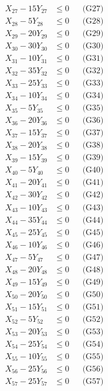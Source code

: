 \documentclass[a4paper,10pt]{article}
\begin{document}
{\begin{align}
X_{27} - 15Y_{27} &\leq 0 && \text{(G27)} \\
X_{28} - 5Y_{28} &\leq 0 && \text{(G28)} \\
X_{29} - 20Y_{29} &\leq 0 && \text{(G29)} \\
X_{30} - 30Y_{30} &\leq 0 && \text{(G30)} \\
X_{31} - 10Y_{31} &\leq 0 && \text{(G31)} \\
X_{32} - 35Y_{32} &\leq 0 && \text{(G32)} \\
\allowbreak
X_{33} - 25Y_{33} &\leq 0 && \text{(G33)} \\
X_{34} - 10Y_{34} &\leq 0 && \text{(G34)} \\
X_{35} - 5Y_{35} &\leq 0 && \text{(G35)} \\
X_{36} - 20Y_{36} &\leq 0 && \text{(G36)} \\
X_{37} - 15Y_{37} &\leq 0 && \text{(G37)} \\
X_{38} - 20Y_{38} &\leq 0 && \text{(G38)} \\
X_{39} - 15Y_{39} &\leq 0 && \text{(G39)} \\
X_{40} - 5Y_{40} &\leq 0 && \text{(G40)} \\
X_{41} - 20Y_{41} &\leq 0 && \text{(G41)} \\
X_{42} - 30Y_{42} &\leq 0 && \text{(G42)} \\
\allowbreak
X_{43} - 10Y_{43} &\leq 0 && \text{(G43)} \\
X_{44} - 35Y_{44} &\leq 0 && \text{(G44)} \\
X_{45} - 25Y_{45} &\leq 0 && \text{(G45)} \\
X_{46} - 10Y_{46} &\leq 0 && \text{(G46)} \\
X_{47} - 5Y_{47} &\leq 0 && \text{(G47)} \\
X_{48} - 20Y_{48} &\leq 0 && \text{(G48)} \\
X_{49} - 15Y_{49} &\leq 0 && \text{(G49)} \\
X_{50} - 20Y_{50} &\leq 0 && \text{(G50)} \\
X_{51} - 15Y_{51} &\leq 0 && \text{(G51)} \\
X_{52} - 5Y_{52} &\leq 0 && \text{(G52)} \\
\allowbreak
X_{53} - 20Y_{53} &\leq 0 && \text{(G53)} \\
X_{54} - 25Y_{54} &\leq 0 && \text{(G54)} \\
X_{55} - 10Y_{55} &\leq 0 && \text{(G55)} \\
X_{56} - 25Y_{56} &\leq 0 && \text{(G56)} \\
X_{57} - 25Y_{57} &\leq 0 && \text{(G57)} \\

\end{align}}
\end{document}
